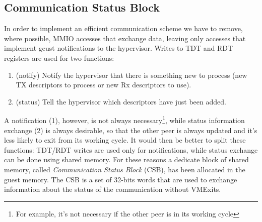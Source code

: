 \subsection{Communication Status Block}
In order to implement an efficient communication scheme we have to remove, where possible, MMIO accesses that exchange data, leaving only
accesses that implement geust notifications to the hypervisor.
Writes to TDT and RDT registers are used for two functions:
\begin{enumerate}
  \item (notify) Notify the hypervisor that there is something new to process (new TX descriptors to process or new Rx descriptors to use).
  \item (status) Tell the hypervisor which descriptors have just been added.
\end{enumerate}
A notification (1), however, is not always necessary\footnote{For example, it's not necessary if the other peer is in its working cycle}, 
while status information exchange (2) is always desirable, so that the other peer is always updated and it's less likely to exit from its
working cycle.
It would then be better to split these functions: TDT/RDT writes are used only for notifications, while status exchange can be done using
shared memory. For these reasons a dedicate block of shared memory, called \emph{Communication Status Block} (CSB), has been allocated
in the guest memory. The CSB is a set of 32-bits words that are used to exchange information about the status of the communication without
VMExits.

\vspace{0.5cm}

